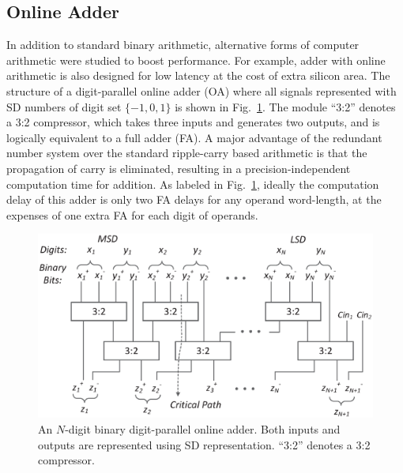 \documentclass[10pt, conference, compsocconf]{IEEEtran}
\begin{document}
\subsection{Online Adder}\label{subsec:online_adder}
In addition to standard binary arithmetic, alternative forms of computer arithmetic were studied to boost performance. For example, adder with online arithmetic is also designed for low latency at the cost of extra silicon area. The structure of a digit-parallel online adder (OA) where all signals represented with SD numbers of digit set $\{-1,0,1\}$ is shown in Fig.~\ref{Fig:Radix2SD_adder}. The module ``3:2'' denotes a 3:2 compressor, which takes three inputs and generates two outputs, and is logically equivalent to a full adder (FA). A major advantage of the redundant number system over the standard ripple-carry based arithmetic is that the propagation of carry is eliminated, resulting in a precision-independent computation time for addition. As labeled in Fig.~\ref{Fig:Radix2SD_adder}, ideally the computation delay of this adder is only two FA delays for any operand word-length, at the expenses of one extra FA for each digit of operands.
%
\begin{figure}[tbp]
  \centering
  \includegraphics[width=.45\textwidth]{./figures/SDAdder.eps}
  \vspace{-1ex}
  \caption{An $N$-digit binary digit-parallel online adder. Both inputs and outputs are represented using SD representation. ``3:2'' denotes a 3:2 compressor.}
  \label{Fig:Radix2SD_adder}
  \vspace{-2ex}
\end{figure}
\end{document}
